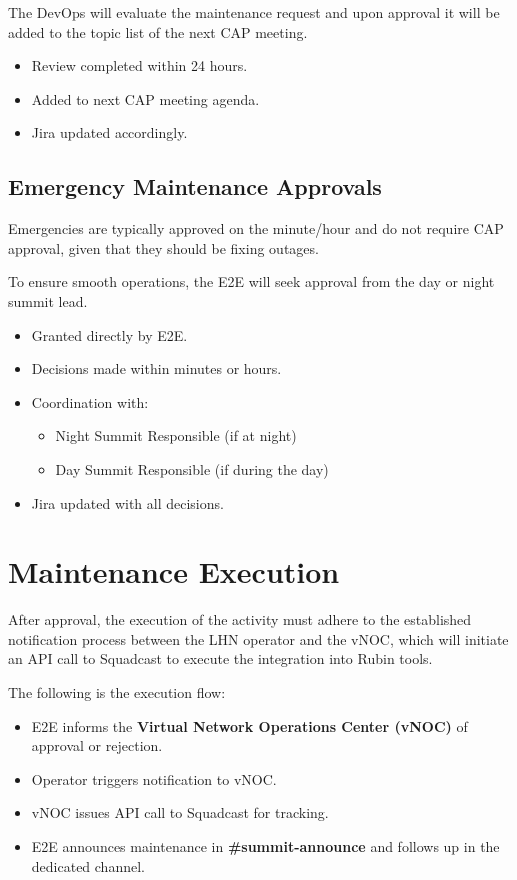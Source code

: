 The DevOps will evaluate the maintenance request and upon approval it will be added to the topic list of the next CAP meeting. 

\begin{itemize}[label=--]
  \item Review completed within 24 hours.
  \item Added to next CAP meeting agenda.
  \item Jira updated accordingly.
\end{itemize}

\subsection{Emergency Maintenance Approvals}

Emergencies are typically approved on the minute/hour and do not require CAP approval, given that they should be fixing outages.

To ensure smooth operations, the E2E will seek approval from the day or night summit lead. 

\begin{itemize}[label=--]
  \item Granted directly by E2E.
  \item Decisions made within minutes or hours.
  \item Coordination with:
    \begin{itemize}
      \item Night Summit Responsible (if at night)
      \item Day Summit Responsible (if during the day)
    \end{itemize}
  \item Jira updated with all decisions.
\end{itemize}

\section{Maintenance Execution}

After approval, the execution of the activity must adhere to the established notification process between the LHN operator and the vNOC, which will initiate an API call to Squadcast to execute the integration into Rubin tools.

The following is the execution flow:

\begin{itemize}[label=--]
  \item E2E informs the \textbf{Virtual Network Operations Center (vNOC)} of approval or rejection.
  \item Operator triggers notification to vNOC.
  \item vNOC issues API call to Squadcast for tracking.
  \item E2E announces maintenance in \textbf{\#summit-announce} and follows up in the dedicated channel.
\end{itemize}

